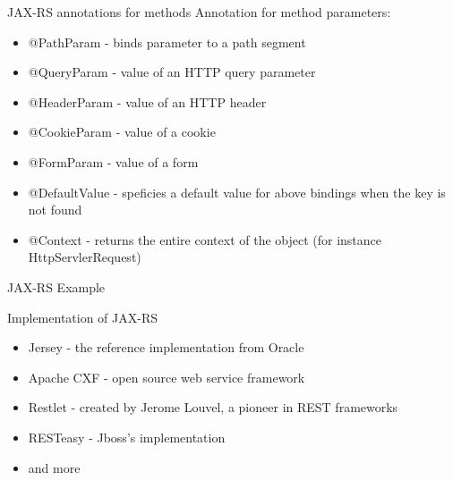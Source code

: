 	\begin{frame}{JAX-RS annotations for methods}
		Annotation for method parameters:
		\begin{itemize}
		  \item @PathParam - binds parameter to a path segment
		  \item @QueryParam - value of an HTTP query parameter
		  \item @HeaderParam - value of an HTTP header
		  \item @CookieParam - value of a cookie
		  \item @FormParam - value of a form
		  \item @DefaultValue - speficies a default value for above bindings when the key is not found
		  \item @Context - returns the entire context of the object (for instance HttpServlerRequest) 
		\end{itemize}
	\end{frame}
		
	\begin{frame}{JAX-RS Example}
		
	\end{frame}	
		
	\begin{frame}{Implementation of JAX-RS}
		\begin{itemize}
			\item Jersey - the reference implementation from Oracle
			\item Apache CXF - open source web service framework 
			\item Restlet - created by Jerome Louvel, a pioneer in REST frameworks
			\item RESTeasy - Jboss's implementation
			\item and more
		\end{itemize}
	\end{frame}
